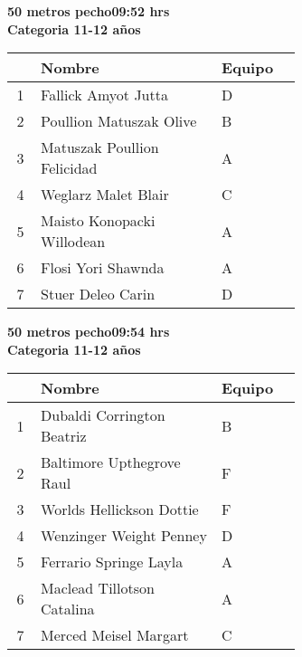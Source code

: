 \begin{minipage}{0.95\linewidth}\vspace{0.5cm} 
\begin{flushleft}
\textbf{
\hspace{-0.15cm}50 metros pecho\hspace{1.5cm}09:52 hrs \\Categoria 11-12 años}\vspace{-0.2cm} 
\end{flushleft}
\begin{tabular}{cp{0.63\linewidth}l}
\hline
& \textbf{Nombre} & \textbf{Equipo} \\ \hline
1 & Fallick Amyot Jutta & D \\ 
2 & Poullion Matuszak Olive & B \\ 
3 & Matuszak Poullion Felicidad & A \\ 
4 & Weglarz Malet Blair & C \\ 
5 & Maisto Konopacki Willodean & A \\ 
6 & Flosi Yori Shawnda & A \\ 
7 & Stuer Deleo Carin & D \\ 
\end{tabular}
\end{minipage}
\begin{minipage}{0.95\linewidth}\vspace{0.5cm} 
\begin{flushleft}
\textbf{
\hspace{-0.15cm}50 metros pecho\hspace{1.5cm}09:54 hrs \\Categoria 11-12 años}\vspace{-0.2cm} 
\end{flushleft}
\begin{tabular}{cp{0.63\linewidth}l}
\hline
& \textbf{Nombre} & \textbf{Equipo} \\ \hline
1 & Dubaldi Corrington Beatriz & B \\ 
2 & Baltimore Upthegrove Raul & F \\ 
3 & Worlds Hellickson Dottie & F \\ 
4 & Wenzinger Weight Penney & D \\ 
5 & Ferrario Springe Layla & A \\ 
6 & Maclead Tillotson Catalina & A \\ 
7 & Merced Meisel Margart & C \\ 
\end{tabular}
\end{minipage}
